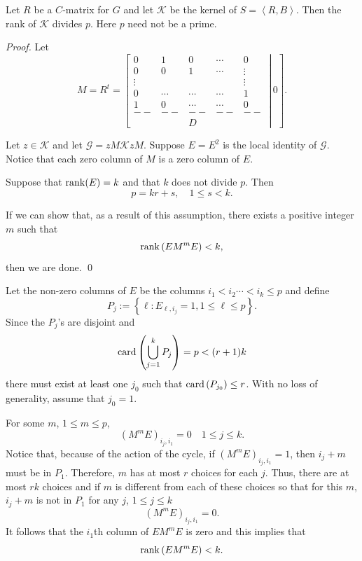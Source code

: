 \begin{theorem}		\label{thm:4.9}
Let $R$ be a $C$-matrix for $G$ and let $\mathcal{K}$ be the kernel of
$S=\left\langle R,B\right\rangle$. Then the rank of 
$\mathcal{K}$ divides $p$. Here $p$ need not be a prime.
\end{theorem}

\begin{proof}
Let 
\[
  M=R^t=\left[ \left.\begin{matrix} 
	0 & 1 & 0 & \cdots & 0 \\
	0 & 0 & 1 & \cdots & \vdots \\
	\vdots & {} & {} & {} & \vdots \\
	0 & \cdots & \cdots & \cdots & 1 \\
	1 & 0 & \cdots & \cdots & 0 \\
	{--} & {--} & {--} & {--} & {--}  \\
	{} & {} & D & {} & {}
	\end{matrix}\,\right|\,0\right] .
\]

Let $z\in \mathcal{K}$ and let $\mathcal{G} = zM\mathcal{K}zM$. 
Suppose $E=E^2$ is the local identity of $\mathcal{G}$. 
Notice that each zero column of $M$ is a zero column of $E$.

Suppose that $\operatorname{rank}(E)=k$ and that $k$ does not divide $p$. 
Then
\[
  p=kr+s,\quad 1\le s<k.
\]

If we can show that, as a result of this assumption, there exists a positive
integer $m$ such that
\[
  \operatorname{rank}\left( EM^mE\right) <k,
\]
then we are done.
\qed
\end{proof}

Let the non-zero columns of $E$ be the columns $i_1<i_2\cdots<i_k\le p$ and
define
\[
  P_j:=\left\{\ell:E_{\ell,i_j}=1,1\le\ell\le p\right\}.
\]
Since the $P_j$'s are disjoint and
\[
  \operatorname{card}\left( \bigcup\limits_{j=1}^k P_j\right) =p<(r+1)k
\]
there must exist at least one $j_0$ such that $\operatorname{card}\left( P_{j_0}\right) \le r$. 
With no loss of generality, assume that $j_0=1$.

For some $m$, $1\le m\le p$,
\[
  \left( M^mE\right) _{i_j,i_1}=0\quad 1\le j\le k.
\]
Notice that, because of the action of the cycle, if $\left( M^mE\right) _{i_j,i_1}=1$,
then $i_j+m$ must be in $P_1$. 
Therefore, $m$ has at most $r$ choices for each $j$. 
Thus, there are at most $rk$ choices and if $m$ is different from each of these choices so that for this $m$, $i_j+m$ is not in $P_1$ for any $j$, $1\le j\le k$
\[
  \left( M^mE\right) _{i_j,i_1}=0.
\]
It follows that the $i_1$th column of $EM^mE$ is zero and this implies that
\[
  \operatorname{rank}\left( EM^mE\right) <k.
\]

